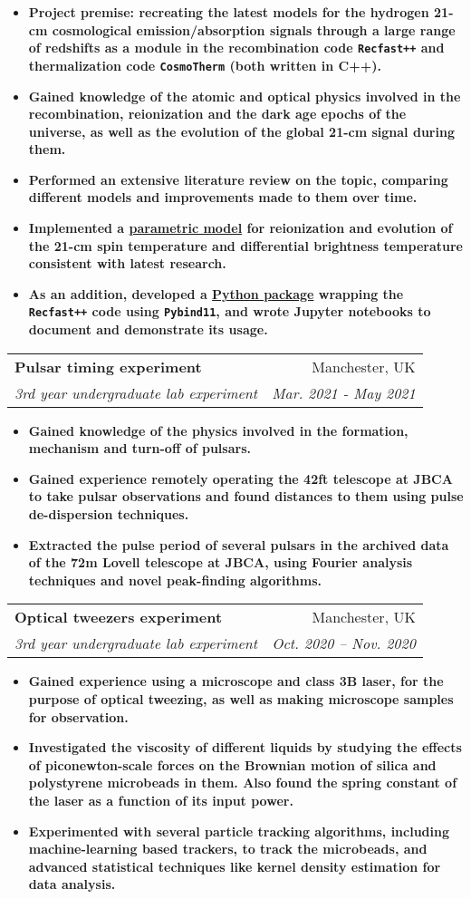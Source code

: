 \documentclass[letterpaper,11pt]{article}
\makeatletter
\newcommand{\resumeItem}[2]{
  \item\small{
    \textbf{#1}{ #2 \vspace{-2pt}}
  }
}
\newcommand{\resumeSubheading}[4]{
  \vspace{-1pt}\item
    \begin{tabular*}{0.97\textwidth}[t]{l@{\extracolsep{\fill}}r}
      \textbf{#1} & #2 \\
      \textit{\small#3} & \textit{\small #4} \\
    \end{tabular*}\vspace{-5pt}
}
\newcommand{\resumeItemListStart}{\begin{itemize}}
\newcommand{\resumeItemListEnd}{\end{itemize}\vspace{-5pt}}
\makeatother
\begin{document}
      \resumeItemListStart
        \resumeItem
          {\normalfont \textbf{Project premise}: recreating the latest models for the hydrogen 21-cm cosmological emission/absorption signals through a large range of redshifts as a module in the recombination code \texttt{Recfast++} and thermalization code \texttt{CosmoTherm} (both written in C++).}{}
        \resumeItem
          {\normalfont Gained knowledge of the atomic and optical physics involved in the recombination, reionization and the dark age epochs of the universe, as well as the evolution of the global 21-cm signal during them.}{}
        \resumeItem
          {\normalfont Performed an extensive literature review on the topic, comparing different models and improvements made to them over time.}{}
        \resumeItem
          {\normalfont Implemented a \href{https://bitbucket.org/Jacetoto/recfast-.vx/src/Recfast_JD_21cm_modelling/}{parametric model} for reionization and evolution of the 21-cm spin temperature and differential brightness temperature consistent with latest research.}{}
        \resumeItem
          {\normalfont As an addition, developed a \href{https://bitbucket.org/Jacetoto/recfast-.vx/src/Python-wrapper/}{Python package} wrapping the \texttt{Recfast++} code using \texttt{Pybind11}, and wrote Jupyter notebooks to document and demonstrate its usage.}{}
      \resumeItemListEnd
       
      \resumeSubheading
      {Pulsar timing experiment}{Manchester, UK}
      {3rd year undergraduate lab experiment}{Mar. 2021 - May 2021}
      \resumeItemListStart
        \resumeItem
          {\normalfont Gained knowledge of the physics involved in the formation, mechanism and turn-off of pulsars.}{}
        \resumeItem
          {\normalfont Gained experience remotely operating the 42ft telescope at JBCA to take pulsar observations and found distances to them using pulse de-dispersion techniques. }{}
        \resumeItem
          {\normalfont Extracted the pulse period of several pulsars in the archived data of the 72m Lovell telescope at JBCA, using Fourier analysis techniques and novel peak-finding algorithms.}{}
      \resumeItemListEnd

      \resumeSubheading
      {Optical tweezers experiment}{Manchester, UK}
      {3rd year undergraduate lab experiment}{Oct. 2020 -- Nov. 2020}
      \resumeItemListStart
        \resumeItem
          {\normalfont Gained experience using a microscope and class 3B laser, for the purpose of optical tweezing, as well as making microscope samples for observation.}{}
        \resumeItem
          {\normalfont Investigated the viscosity of different liquids by studying the effects of piconewton-scale forces on the Brownian motion of silica and polystyrene microbeads in them. Also found the spring constant of the laser as a function of its input power.}{}
        \resumeItem
          {\normalfont Experimented with several particle tracking algorithms, including machine-learning based trackers, to track the microbeads, and advanced statistical techniques like kernel density estimation for data analysis.}{}
      \resumeItemListEnd
\end{document}
